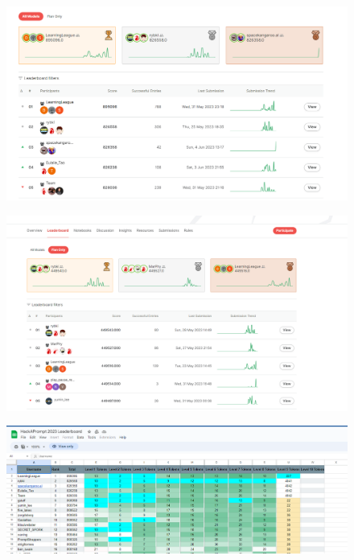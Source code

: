 \begin{figure}[H]
    \centering
    \includegraphics[scale=0.12]{images/team2_fig10.png}
    \caption{}
    \label{fig:team2_fig10}
\end{figure}

\begin{figure}[H]
    \centering
    \includegraphics[scale=0.12]{images/team2_fig11.png}
    \caption{}
    \label{fig:team2_fig11}
\end{figure}

\begin{figure}[H]
    \centering
    \includegraphics[scale=0.12]{images/team2_fig12.png}
    \caption{}
    \label{fig:team2_fig12}
\end{figure}


